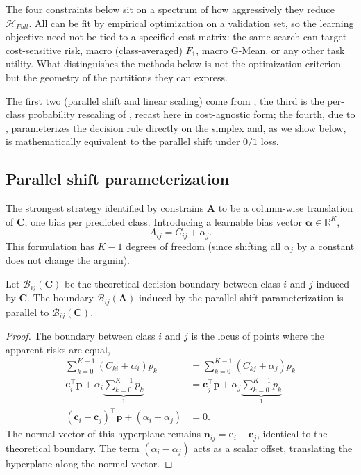 The four constraints below sit on a spectrum of how aggressively they reduce $\mathcal{H}_{Full}$. All can be fit by empirical optimization on a validation set, so the learning objective need not be tied to a specified cost matrix: the same search can target cost-sensitive risk, macro (class-averaged) $F_1$, macro G-Mean, or any other task utility. What distinguishes the methods below is not the optimization criterion but the geometry of the partitions they can express.

The first two (parallel shift and linear scaling) come from \citet{obrien2008costsensitive}; the third is the per-class probability rescaling of \citet{lachiche2003improving}, recast here in cost-agnostic form; the fourth, due to \citet{legnaro2025multiclass}, parameterizes the decision rule directly on the simplex and, as we show below, is mathematically equivalent to the parallel shift under $0/1$ loss.

\subsection{Parallel shift parameterization}\label{sec:parallel_shifts}

The strongest strategy identified by \citet{obrien2008costsensitive} constrains $\mathbf{A}$ to be a column-wise translation of $\mathbf{C}$, one bias per predicted class. Introducing a learnable bias vector $\boldsymbol{\alpha} \in \mathbb{R}^K$,
\begin{equation}
    A_{ij} = C_{ij} + \alpha_j.
\end{equation}
This formulation has $K-1$ degrees of freedom (since shifting all $\alpha_j$ by a constant does not change the argmin).

\begin{proposition}\label{prop:parallel_invariance}
    Let $\mathcal{B}_{ij}(\mathbf{C})$ be the theoretical decision boundary between class $i$ and $j$ induced by $\mathbf{C}$. The boundary $\mathcal{B}_{ij}(\mathbf{A})$ induced by the parallel shift parameterization is parallel to $\mathcal{B}_{ij}(\mathbf{C})$.
\end{proposition}

\begin{proof}
    The boundary between class $i$ and $j$ is the locus of points where the apparent risks are equal,
    \begin{align}
        \sum_{k=0}^{K-1} (C_{ki} + \alpha_i) p_k &= \sum_{k=0}^{K-1} (C_{kj} + \alpha_j) p_k \\
        \mathbf{c}_i^\top \mathbf{p} + \alpha_i \underbrace{\sum_{k=0}^{K-1} p_k}_{1} &= \mathbf{c}_j^\top \mathbf{p} + \alpha_j \underbrace{\sum_{k=0}^{K-1} p_k}_{1} \\
        (\mathbf{c}_i - \mathbf{c}_j)^\top \mathbf{p} + (\alpha_i - \alpha_j) &= 0.
    \end{align}
    The normal vector of this hyperplane remains $\mathbf{n}_{ij} = \mathbf{c}_i - \mathbf{c}_j$, identical to the theoretical boundary. The term $(\alpha_i - \alpha_j)$ acts as a scalar offset, translating the hyperplane along the normal vector.
\end{proof}

